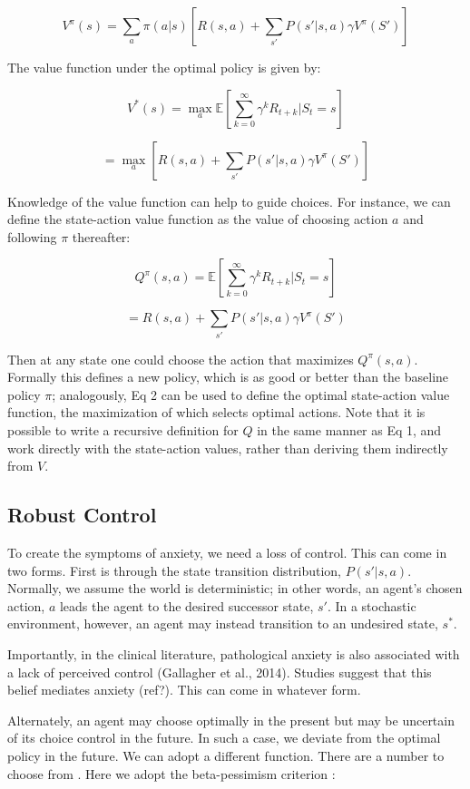 \documentclass[11pt]{article} %
\begin{document}
$$ V^\pi(s) = \sum_a \pi(a|s) \left[ R(s,a) + \sum_{s'} P(s'|s,a) \gamma V^\pi (S') \right] $$

The value function under the optimal policy is given by:

$$ V^*(s) = \max_a \mathbb{E} \left[ \sum^{\infty}_{k=0} \gamma^k R_{t+k} | S_t = s \right] $$

$$ = \max_a \left[ R(s,a) + \sum_{s'} P(s'|s,a) \gamma V^\pi (S') \right] $$

Knowledge of the value function can help to guide choices. For instance, we can
define the state-action value function as the value of choosing action $a$ and
following $\pi$ thereafter:

$$ Q^\pi(s,a) = \mathbb{E} \left[ \sum^{\infty}_{k=0} \gamma^k R_{t+k} | S_t = s \right] $$

$$ = R(s,a) + \sum_{s'} P(s'|s,a) \gamma V^\pi (S') $$

Then at any state one could choose the action that maximizes $Q^\pi(s,a)$. Formally
this defines a new policy, which is as good or better than the baseline policy
$\pi$; analogously, Eq 2 can be used to define the optimal state-action value
function, the maximization of which selects optimal actions. Note that it is
possible to write a recursive definition for $Q$ in the same manner as Eq 1, and
work directly with the state-action values, rather than deriving them indirectly
from $V$.

\subsection{Robust Control}

To create the symptoms of anxiety, we need a loss of control. This can come in
two forms. First is through the state transition distribution, $P(s'|s,a)$.
Normally, we assume the world is deterministic; in other words, an agent's chosen
action, $a$ leads the agent to the desired successor state, $s'$. In a stochastic
environment, however, an agent may instead transition to an undesired state, $s^*$.

Importantly, in the clinical literature, pathological anxiety is also associated
with a lack of perceived control (Gallagher et al., 2014). Studies suggest that
this belief mediates anxiety (ref?). This can come in whatever form.

Alternately, an agent may choose optimally in the present but may be uncertain of
its choice control in the future. In such a case, we deviate from the optimal
policy in the future. We can adopt a different function. There are a number to
choose from \citep{Garcia2015}. Here we adopt the beta-pessimism criterion
\citep{Gaskett2003}:
\end{document}
